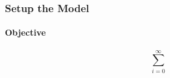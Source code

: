 \documentclass[11pt]{article}
\begin{document}
		\setcounter{equation}{0}
		\subsubsection{Setup the Model}
			\paragraph{Objective}
				\begin{equation}
					\sum_{i=0}^\infty 
				\end{equation}	
\end{document}
